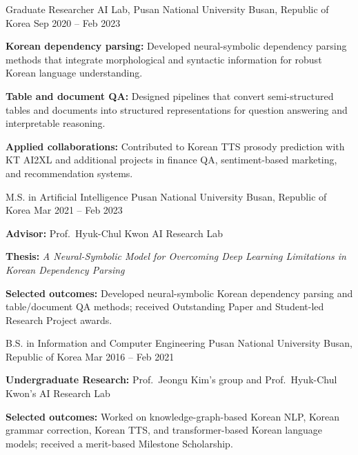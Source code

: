 \documentclass[11pt, a4paper]{awesome-cv}
\begin{document}
\begin{cventries}
  \cventry
    {Graduate Researcher}
    {AI Lab, Pusan National University}
    {Busan, Republic of Korea}
    {Sep 2020 -- Feb 2023}
    {
      \begin{cvitems}
        \item {\textbf{Korean dependency parsing:} Developed neural-symbolic dependency parsing methods that integrate morphological and syntactic information for robust Korean language understanding.}
        \item {\textbf{Table and document QA:} Designed pipelines that convert semi-structured tables and documents into structured representations for question answering and interpretable reasoning.}
        \item {\textbf{Applied collaborations:} Contributed to Korean TTS prosody prediction with KT AI2XL and additional projects in finance QA, sentiment-based marketing, and recommendation systems.}
      \end{cvitems}
    }\par
\end{cventries}


\begin{cventries}
  \cventry
    {M.S. in Artificial Intelligence}
    {Pusan National University}
    {Busan, Republic of Korea}
    {Mar 2021 -- Feb 2023}
    {
      \begin{cvitems}
        \item {\textbf{Advisor:} Prof.~Hyuk-Chul Kwon \textbar{} AI Research Lab}
        \item {\textbf{Thesis:} \textit{A Neural-Symbolic Model for Overcoming Deep Learning Limitations in Korean Dependency Parsing}}
        \item {\textbf{Selected outcomes:} Developed neural-symbolic Korean dependency parsing and table/document QA methods; received Outstanding Paper and Student-led Research Project awards.}
      \end{cvitems}
    }\par
  \cventry
    {B.S. in Information and Computer Engineering}
    {Pusan National University}
    {Busan, Republic of Korea}
    {Mar 2016 -- Feb 2021}
    {
      \begin{cvitems}
        \item {\textbf{Undergraduate Research:} Prof.~Jeongu Kim's group and Prof.~Hyuk-Chul Kwon's AI Research Lab}
        \item {\textbf{Selected outcomes:} Worked on knowledge-graph-based Korean NLP, Korean grammar correction, Korean TTS, and transformer-based Korean language models; received a merit-based Milestone Scholarship.}
      \end{cvitems}
    }\par
\end{cventries}
\end{document}

